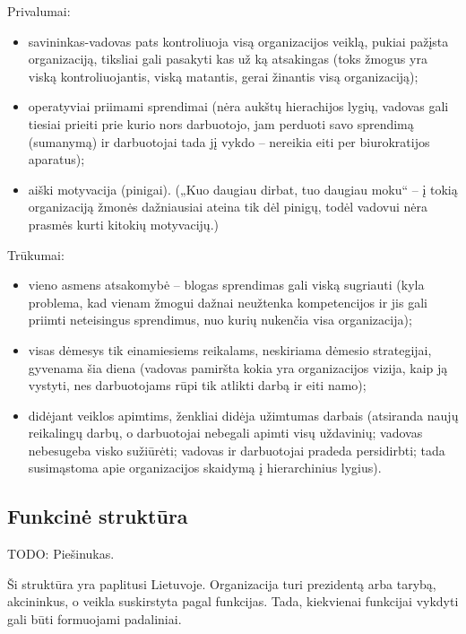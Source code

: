 Privalumai:
\begin{itemize}
  \item savininkas-vadovas pats kontroliuoja visą organizacijos veiklą,
    pukiai pažįsta organizaciją, tiksliai gali pasakyti kas už ką
    atsakingas (toks žmogus yra viską kontroliuojantis, viską matantis,
    gerai žinantis visą organizaciją);
  \item operatyviai priimami sprendimai (nėra aukštų hierachijos lygių,
    vadovas gali tiesiai prieiti prie kurio nors darbuotojo, jam
    perduoti savo sprendimą (sumanymą) ir darbuotojai tada jį vykdo –
    nereikia eiti per biurokratijos aparatus);
  \item aiški motyvacija (pinigai). („Kuo daugiau dirbat, tuo daugiau
    moku“ – į tokią organizaciją žmonės dažniausiai ateina tik dėl
    pinigų, todėl vadovui nėra prasmės kurti kitokių motyvacijų.)
\end{itemize}

Trūkumai:
\begin{itemize}
  \item vieno asmens atsakomybė – blogas sprendimas gali viską sugriauti
    (kyla problema, kad vienam žmogui dažnai neužtenka kompetencijos
    ir jis gali priimti neteisingus sprendimus, nuo kurių nukenčia
    visa organizacija);
  \item visas dėmesys tik einamiesiems reikalams, neskiriama dėmesio
    strategijai, gyvenama šia diena (vadovas pamiršta kokia yra
    organizacijos vizija, kaip ją vystyti, nes darbuotojams rūpi tik
    atlikti darbą ir eiti namo);
  \item didėjant veiklos apimtims, ženkliai didėja užimtumas darbais
    (atsiranda naujų reikalingų darbų, o darbuotojai nebegali apimti
    visų uždavinių; vadovas nebesugeba visko sužiūrėti; vadovas ir
    darbuotojai pradeda persidirbti; tada susimąstoma apie organizacijos
    skaidymą į hierarchinius lygius).
\end{itemize}

\subsection{Funkcinė struktūra}

TODO: Piešinukas.

Ši struktūra yra paplitusi Lietuvoje. Organizacija turi prezidentą arba
tarybą, akcininkus, o veikla suskirstyta pagal funkcijas. Tada,
kiekvienai funkcijai vykdyti gali būti formuojami padaliniai.

